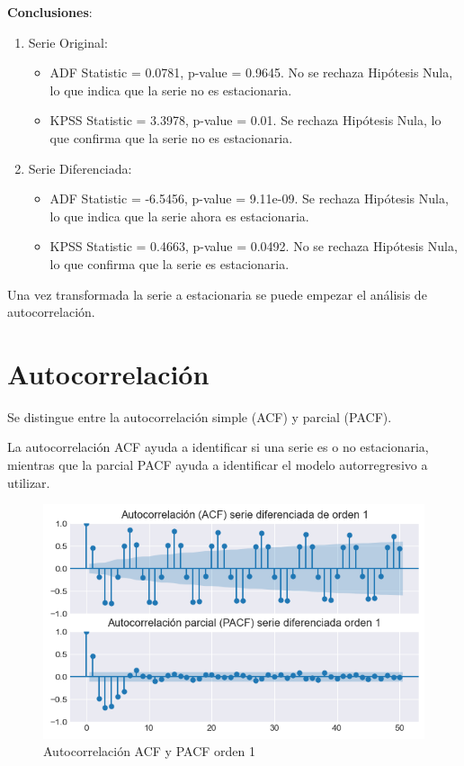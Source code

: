 \textbf{Conclusiones}:
\begin{enumerate}
	\item Serie Original:
	\begin{itemize}
		\item ADF Statistic = 0.0781, p-value = 0.9645. No se rechaza Hipótesis Nula, lo que indica que la serie no es estacionaria.
		\item KPSS Statistic = 3.3978, p-value = 0.01.  Se rechaza Hipótesis Nula, lo que confirma que la serie no es estacionaria.
	\end{itemize}
	\item Serie Diferenciada:
	\begin{itemize}
		\item ADF Statistic = -6.5456, p-value = 9.11e-09. Se rechaza Hipótesis Nula, lo que indica que la serie ahora es estacionaria.
		\item KPSS Statistic = 0.4663, p-value = 0.0492. No se rechaza Hipótesis Nula, lo que confirma que la serie es estacionaria.
	\end{itemize}
\end{enumerate}

Una vez transformada la serie a estacionaria se puede empezar el análisis de autocorrelación.

\section{Autocorrelación}

Se distingue entre la autocorrelación simple (ACF) y parcial (PACF).

La autocorrelación ACF ayuda a identificar si una serie es o no estacionaria, mientras que la parcial PACF ayuda a identificar el modelo autorregresivo a utilizar.

\begin{figure}[h]
	\centering
	\includegraphics[width=0.7\linewidth]{autocorrelacion_PACF_ACF}
	\caption{Autocorrelación ACF y PACF orden 1}
	\label{fig:autocorrelacionpacfacf}
\end{figure}


